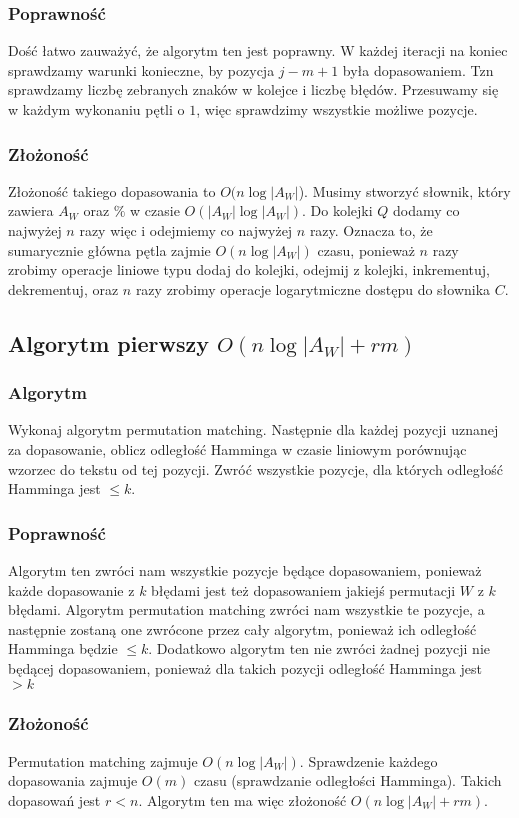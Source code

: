 \documentclass[a4paper,11pt]{article}
\begin{document}
\subsubsection*{Poprawność}
Dość łatwo zauważyć, że algorytm ten jest poprawny. W każdej iteracji na koniec sprawdzamy warunki konieczne, by pozycja $j-m+1$ była dopasowaniem. Tzn sprawdzamy liczbę zebranych znaków w kolejce i liczbę błędów. Przesuwamy się w każdym wykonaniu pętli o $1$, więc sprawdzimy wszystkie możliwe pozycje.
\subsubsection*{Złożoność}
Złożoność takiego dopasowania to $O(n\log |A_W|$). Musimy stworzyć słownik, który zawiera $A_W$ oraz $\%$ w czasie $O(|A_W|\log |A_W|)$. Do kolejki $Q$ dodamy co najwyżej $n$ razy więc i odejmiemy co najwyżej $n$ razy. Oznacza to, że sumarycznie główna pętla zajmie $O(n\log |A_W|)$ czasu, ponieważ $n$ razy zrobimy operacje liniowe typu dodaj do kolejki, odejmij z kolejki, inkrementuj, dekrementuj, oraz $n$ razy zrobimy operacje logarytmiczne dostępu do słownika $C$.

\subsection{Algorytm pierwszy $O(n\log|A_W|+rm)$}
\subsubsection*{Algorytm}
Wykonaj algorytm permutation matching. Następnie dla każdej pozycji uznanej za dopasowanie, oblicz odległość Hamminga w czasie liniowym porównując wzorzec do tekstu od tej pozycji. Zwróć wszystkie pozycje, dla których odległość Hamminga jest $\leq k$. \subsubsection*{Poprawność}
Algorytm ten zwróci nam wszystkie pozycje będące dopasowaniem, ponieważ każde dopasowanie z $k$ błędami jest też dopasowaniem jakiejś permutacji $W$ z $k$ błędami. Algorytm permutation matching zwróci nam wszystkie te pozycje, a następnie zostaną one zwrócone przez cały algorytm, ponieważ ich odległość Hamminga będzie $\leq k$. Dodatkowo algorytm ten nie zwróci żadnej pozycji nie będącej dopasowaniem, ponieważ dla takich pozycji odległość Hamminga jest $> k$
\subsubsection*{Złożoność}
Permutation matching zajmuje $O(n\log|A_W|)$. Sprawdzenie każdego dopasowania zajmuje $O(m)$ czasu (sprawdzanie odległości Hamminga). Takich dopasowań jest $r < n$. Algorytm ten ma więc złożoność $O(n\log|A_W| +rm)$.
\end{document}
